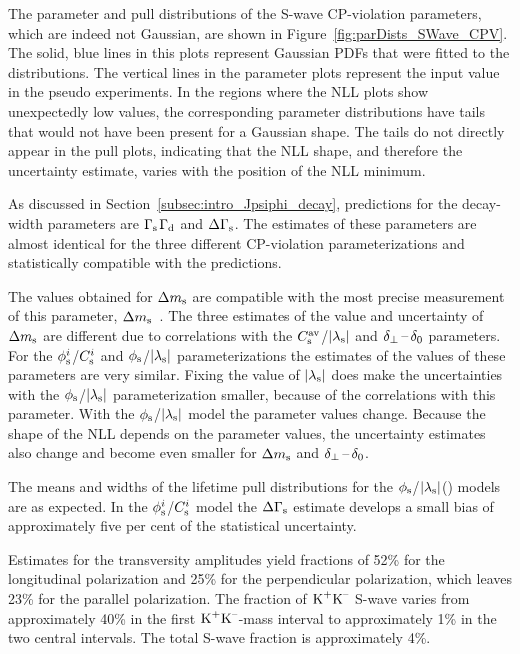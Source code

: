 The parameter and pull distributions of the S-wave CP-violation parameters, which are indeed not Gaussian, are shown in
Figure~\ref{fig:parDists_SWave_CPV}. The solid, blue lines in this plots represent Gaussian PDFs that were fitted to the distributions. The
vertical lines in the parameter plots represent the input value in the pseudo experiments. In the regions where the NLL plots show
unexpectedly low values, the corresponding parameter distributions have tails that would not have been present for a Gaussian shape. The
tails do not directly appear in the pull plots, indicating that the NLL shape, and therefore the uncertainty estimate, varies with the
position of the NLL minimum.

As discussed in Section~\ref{subsec:intro_Jpsiphi_decay}, predictions for the decay-width parameters are
$\Gamma_\text{s}$\textapprox$\Gamma_\text{d}$\unitsp\invps{} and $\Delta\Gamma_\text{s}$\unitsp\invps{}. The estimates of these
parameters are almost identical for the three different CP-violation parameterizations and statistically compatible with the predictions.

The values obtained for $\Delta m_\text{s}$ are compatible with the most precise measurement of this parameter,
$\Delta m_\text{s}$\unitsp\invps~\cite{LHCb-PAPER-2013-006}. The three estimates of the value and uncertainty of $\Delta m_\text{s}$ are
different due to correlations with the $C_\text{s}^\text{av}$/$|{\lambda_{\text{s}}}|$ and $\delta_{\perp}\,\text{--}\,\delta_{0}$ parameters. For the $\phi_\text{s}^{i}$/$C_\text{s}^{i}$ and
$\phi_\text{s}$/$|{\lambda_{\text{s}}}|$ parameterizations the estimates of the values of these parameters are very similar. Fixing the value of
$|{\lambda_{\text{s}}}|$ does make the uncertainties with the $\phi_\text{s}$/$|{\lambda_{\text{s}}}|$ parameterization smaller, because of the correlations with this
parameter. With the $\phi_\text{s}$/$|{\lambda_{\text{s}}}|$ model the parameter values change. Because the shape of the NLL depends on the parameter values, the
uncertainty estimates also change and become even smaller for $\Delta m_\text{s}$ and $\delta_{\perp}\,\text{--}\,\delta_{0}$.

The means and widths of the lifetime pull distributions for the $\phi_\text{s}$/$|{\lambda_{\text{s}}}|$() models are as expected. In the $\phi_\text{s}^{i}$/$C_\text{s}^{i}$
model the $\Delta\Gamma_\text{s}$ estimate develops a small bias of approximately five per cent of the statistical uncertainty.

Estimates for the transversity amplitudes yield fractions of 52\% for the longitudinal \BstoJpsiphi{} polarization and 25\% for the
perpendicular polarization, which leaves 23\% for the parallel polarization. The fraction of $\text{K}^\text{+}\text{K}^\text{--}$ S-wave varies from approximately 40\% in
the first $\text{K}^\text{+}\text{K}^\text{--}$-mass interval to approximately 1\% in the two central intervals. The total S-wave fraction is approximately 4\%.

